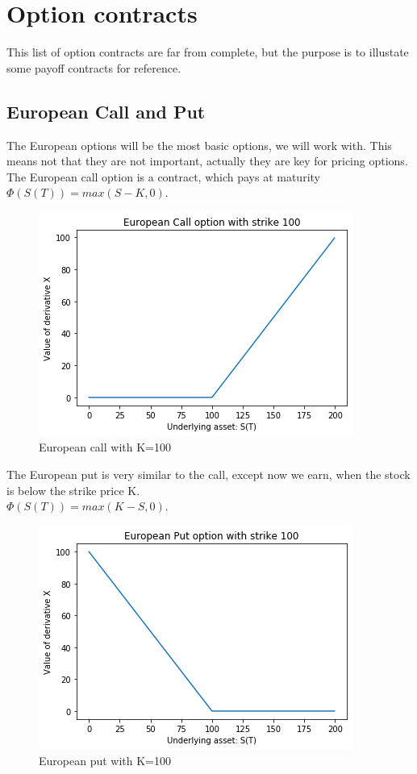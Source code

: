 
\chapter{Option contracts} %

\label{AppendixA} %

This list of option contracts are far from complete, but the purpose is to illustate some payoff contracts for reference.

\section{European Call and Put}
The European options will be the most basic options, we will work with. This means not that they are not important, actually they are key for pricing options. The European call option is a contract, which pays at maturity $\Phi(S(T))=max(S-K,0)$. 
\begin{figure}[h]
\centering
\includegraphics{Figures/euroCall.png}
\decoRule
\caption[]{European call with K=100}
\label{fig:EuroCall}
\end{figure}

The European put is very similar to the call, except now we earn, when the stock is below the strike price K.\\
$\Phi(S(T))=max(K-S,0)$.
\begin{figure}[h]
\centering
\includegraphics{Figures/euroPut.png}
\decoRule
\caption[]{European put with K=100}
\label{fig:EuroPut}
\end{figure}
